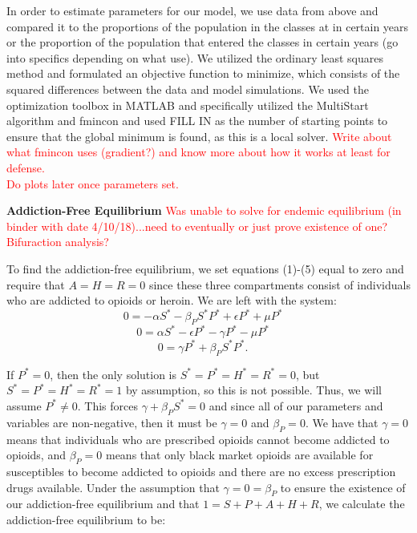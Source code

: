 \documentclass[12pt]{article}
\begin{document}
In order to estimate parameters for our model, we use data from above and compared it to the proportions of the population in the classes at in certain years or the proportion of the population that entered the classes in certain years (go into specifics depending on what use). We utilized the ordinary least squares method and formulated an objective function to minimize, which consists of the squared differences between the data and model simulations. We used the optimization toolbox in MATLAB and specifically utilized the MultiStart algorithm and fmincon and used FILL IN as the number of starting points to ensure that the global minimum is found, as this is a local solver. \textcolor{red}{Write about what fmincon uses (gradient?) and know more about how it works at least for defense.} \\

\textcolor{red}{Do plots later once parameters set.}






 \textbf{Addiction-Free Equilibrium} 
\textcolor{red}{Was unable to solve for endemic equilibrium (in binder with date 4/10/18)...need to eventually or just prove existence of one? Bifuraction analysis?}

To find the addiction-free equilibrium, we set equations (1)-(5) equal to zero and require that $A=H=R=0$ since these three compartments consist of individuals who are addicted to opioids or heroin. We are left with the system: \\
\[0=-\alpha S^* -\beta_{P} S^* P^* + \epsilon P^* +\mu P^* \quad\]
\[0=\alpha S^* - \epsilon P^* -\gamma P^* - \mu P^* \quad\]
\[0=\gamma P^* + \beta_{P} S^* P^*.   \quad\]



If $P^*=0$, then the only solution is $S^*=P^*=H^*=R^*=0$, but $S^*=P^*=H^*=R^*=1$ by assumption, so this is not possible. Thus, we will assume $P^* \neq 0. $ This forces $\gamma + \beta_{P} S^* =0$ and since all of our parameters and variables are non-negative, then it must be $\gamma=0$ and $\beta_{P}=0$. We have that $\gamma=0$ means that individuals who are prescribed opioids cannot become addicted to opioids, and $\beta_{P}=0$ means that only black market opioids are available for susceptibles to become addicted to opioids and there are no excess prescription drugs available. Under the assumption that $\gamma=0=\beta_{P}$ to ensure the existence of our addiction-free equilibrium and that $1=S+P+A+H+R$, we calculate the addiction-free equilibrium to be: \\
\end{document}
